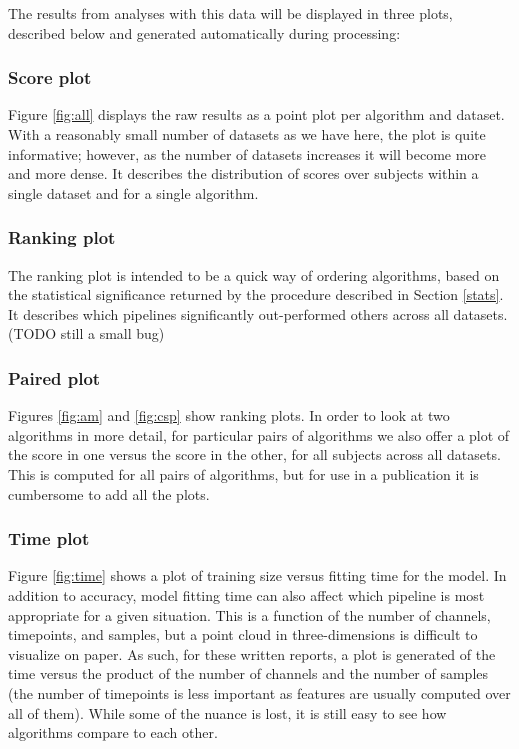 The results from analyses with this data will be displayed in three
plots, described below and generated automatically during processing:

\subsubsection{Score plot}
Figure \ref{fig:all} displays the raw results as a point plot per algorithm and
dataset. With a reasonably small number of datasets as we have here, the plot is
quite informative; however, as the number of datasets increases it will become
more and more dense. It describes the distribution of scores over subjects
within a single dataset and for a single algorithm.

\subsubsection{Ranking plot}
The ranking plot is intended to be a quick way of ordering algorithms, based on
the statistical significance returned by the procedure described in Section
\ref{stats}. It describes which pipelines significantly out-performed others
across all datasets.
(TODO still a small bug)

\subsubsection{Paired plot}
Figures \ref{fig:am} and \ref{fig:csp} show ranking plots. In order to
look at two algorithms in more detail, for particular pairs of
algorithms we also offer a plot of the score in one versus the score in the other,
for all subjects across all datasets. This is computed for all pairs
of algorithms, but for use in a publication it is cumbersome to add
all the plots.

\subsubsection{Time plot}
Figure \ref{fig:time} shows a plot of training size versus fitting
time for the model. In addition to accuracy, model fitting time can also affect which
pipeline is most appropriate for a given situation. This is a function
of the number of channels, timepoints, and samples, but a point
cloud in three-dimensions is difficult to visualize on paper. As such,
for these written reports, a plot is generated of the time versus the product of the
number of channels and the number of samples (the number of timepoints
is less important as features are usually computed over all of
them). While some of the nuance is lost, it is still easy to see how
algorithms compare to each other.

